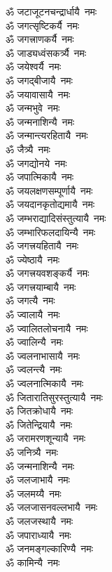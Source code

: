 \begin{flushleft}
\begin{multicols}{2}
ॐ जटाजूटनचन्द्रार्धायै~नमः\\
ॐ जगत्सृष्टिकर्यै~नमः\\
ॐ जगत्त्राणकर्यै~नमः\\
ॐ जाड्यध्वंसकर्त्र्यै~नमः\hfill{}\\
ॐ जयेश्वर्यै~नमः\\
ॐ जगद्बीजायै~नमः\\
ॐ जयावासायै~नमः\\
ॐ जन्मभुवे~नमः\\
ॐ जन्मनाशिन्यै~नमः\\
ॐ जन्मान्त्यरहितायै~नमः\\
ॐ जैत्र्यै~नमः\\
ॐ जगद्योनये~नमः\\
ॐ जपात्मिकायै~नमः\\
ॐ जयलक्षणसम्पूर्णायै~नमः\hfill{}\\
ॐ जयदानकृतोद्यमायै~नमः\\
ॐ जम्भराद्यादिसंस्तुत्यायै~नमः\\
ॐ जम्भारिफलदायिन्यै~नमः\\
ॐ जगत्त्रयहितायै~नमः\\
ॐ ज्येष्ठायै~नमः\\
ॐ जगत्त्रयवशङ्कर्यै~नमः\\
ॐ जगत्त्रयाम्बायै~नमः\\
ॐ जगत्यै~नमः\\
ॐ ज्वालायै~नमः\\
ॐ ज्वालितलोचनायै~नमः\hfill{}\\
ॐ ज्वालिन्यै~नमः\\
ॐ ज्वलनाभासायै~नमः\\
ॐ ज्वलन्त्यै~नमः\\
ॐ ज्वलनात्मिकायै~नमः\\
ॐ जितारातिसुरस्तुत्यायै~नमः\\
ॐ जितक्रोधायै~नमः\\
ॐ जितेन्द्रियायै~नमः\\
ॐ जरामरणशून्यायै~नमः\\
ॐ जनित्र्यै~नमः\\
ॐ जन्मनाशिन्यै~नमः\hfill{}\\
ॐ जलजाभायै~नमः\\
ॐ जलमय्यै~नमः\\
ॐ जलजासनवल्लभायै~नमः\\
ॐ जलजस्थायै~नमः\\
ॐ जपाराध्यायै~नमः\\
ॐ जनमङ्गल्कारिण्यै~नमः\\
ॐ कामिन्यै~नमः\\

\end{multicols}
\end{flushleft}
